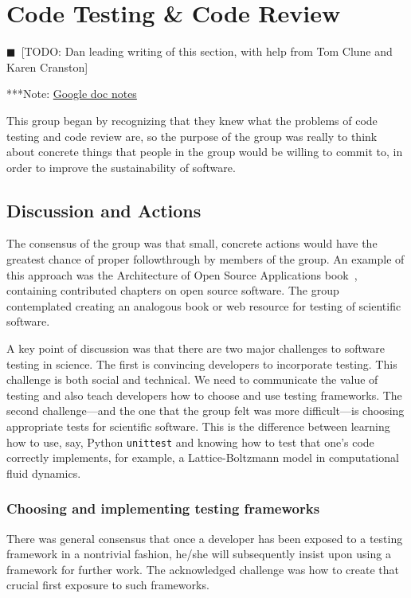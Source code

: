 \documentclass[11pt, oneside]{amsart}
\newcommand{\todo}[1]{{\color{blue}$\blacksquare$~\textsf{[TODO: #1]}}}
\newcommand{\note}[1]{ {\textcolor{blueish}    { ***Note:      #1 }}}
\begin{document}
\section{Code Testing \& Code Review} \label{sec:code_testing}
\todo{Dan leading writing of this section, with help from Tom Clune and Karen Cranston}

\note{\href{http://tinyurl.com/l5t5h45}{Google doc notes}}

This group began by recognizing that they knew what the problems of code testing and code
review are, so the purpose of the group was really to think about
concrete things that people in the group would be willing to commit to, in order
to improve the sustainability of software.

\subsection{Discussion and Actions}

The consensus of the group was that small, concrete actions would have the
greatest chance of proper followthrough by members of the group. An example of
this approach was the Architecture of Open Source Applications book~\cite{aosa},
containing contributed chapters on open source software. The group contemplated
creating an analogous book or web resource for testing of scientific software.

A key point of discussion was that there are two major challenges to software
testing in science. The first is convincing developers to incorporate testing.
This challenge is both social and technical. We need to communicate the value of
testing and also teach developers how to choose and use testing frameworks. The
second challenge---and the one that the group felt was more difficult---is
choosing appropriate tests for scientific software. This is the difference
between learning how to use, say, Python \texttt{unittest} and knowing how to test
that one's code correctly implements, for example, a Lattice-Boltzmann model in
computational fluid dynamics.

\subsubsection{Choosing and implementing testing frameworks} There was general
consensus that once a developer has been exposed to a testing framework in a
nontrivial fashion, he/she will subsequently insist upon using a framework for
further work. The acknowledged challenge was how to create that crucial first
exposure to such frameworks.
\end{document}
